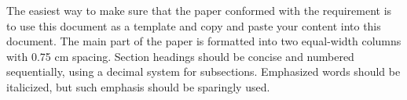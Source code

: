 \documentclass{article}
\title{     }
\author{     }
\date{     }
\begin{document}
The easiest way to make sure that the paper conformed with the requirement is to use this document as a template and copy and paste your content into this document. The main part of the paper is formatted into two equal-width columns with 0.75 cm spacing. Section headings should be concise and numbered sequentially, using a decimal system for subsections. Emphasized words should be italicized, but such emphasis should be sparingly used.
\end{document}
